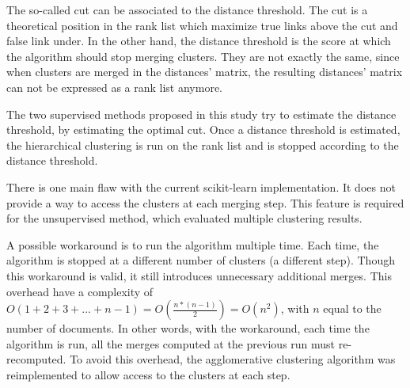 The so-called cut can be associated to the distance threshold.
The cut is a theoretical position in the rank list which maximize true links above the cut and false link under.
In the other hand, the distance threshold is the score at which the algorithm should stop merging clusters.
They are not exactly the same, since when clusters are merged in the distances' matrix, the resulting distances' matrix can not be expressed as a rank list anymore.

The two supervised methods proposed in this study try to estimate the distance threshold, by estimating the optimal cut.
Once a distance threshold is estimated, the hierarchical clustering is run on the rank list and is stopped according to the distance threshold.

There is one main flaw with the current scikit-learn implementation.
It does not provide a way to access the clusters at each merging step.
This feature is required for the unsupervised method, which evaluated multiple clustering results.

A possible workaround is to run the algorithm multiple time.
Each time, the algorithm is stopped at a different number of clusters (a different step).
Though this workaround is valid, it still introduces unnecessary additional merges.
This overhead have a complexity of $O(1 + 2 + 3 + ... + n - 1) = O(\frac{n * (n - 1)}{2}) = O(n^2)$, with $n$ equal to the number of documents.
In other words, with the workaround, each time the algorithm is run, all the merges computed at the previous run must re-recomputed.
To avoid this overhead, the agglomerative clustering algorithm was reimplemented to allow access to the clusters at each step.

